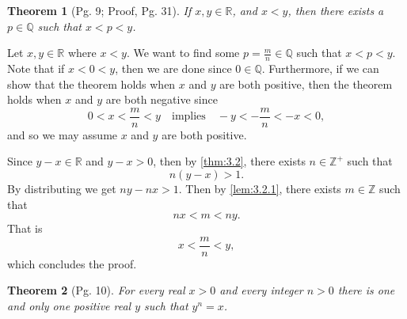 \documentclass[leqno]{article}
\makeatletter
\newtheorem{theorem}{Theorem}[section]
\theoremstyle{definition}
\theoremstyle{remark}
\let\oldproofname=\proofname
\renewcommand{\proofname}{\bf{\textit{\oldproofname}}}
\renewenvironment{proof}[1][\proofname]{\par
  \pushQED{\qed}%
  \normalfont \topsep6\p@\@plus6\p@\relax
  \list{}{\leftmargin=0mm
          \rightmargin=0mm
          \settowidth{\itemindent}{\itshape#1}%
          \labelwidth=4mm
          \parsep=0pt \listparindent=0mm%
  }
  \item[\hskip\labelsep
        \itshape
    #1\@addpunct{.}]\ignorespaces
}{%
  \popQED\endlist\@endpefalse
}
\makeatother
\begin{document}
        \begin{theorem}[Pg. 9; Proof, Pg. 31]\label{thm:3.3} 
            If $x,y\in\mathbb{R}$, and $x<y$, then there exists a $p\in\mathbb{Q}$ such that $x<p<y$. 
        \end{theorem}
            \begin{proof}
                Let $x,y\in\mathbb{R}$ where $x<y$. We want to find some $p=\frac{m}{n}\in\mathbb{Q}$ such that $x<p<y$. Note that if $x<0<y$, then we are done since $0\in\mathbb{Q}$. Furthermore, if we can show that the theorem holds when $x$ and $y$ are both positive, then the theorem holds when $x$ and $y$ are both negative since
                    \begin{equation*}
                        0< x<\frac{m}{n}<y\quad\text{implies}\quad -y<-\frac{m}{n}<-x<0,
                    \end{equation*}
                and so we may assume $x$ and $y$ are both positive.\par\hspace{4mm} Since $ y-x\in\mathbb{R}$ and $y-x>0$, then by \cref{thm:3.2}, there exists $n\in\mathbb{Z}^{+}$ such that
                    \begin{equation*}
                        n(y-x)>1.
                    \end{equation*}
                By distributing we get $ny-nx>1$. Then by \cref{lem:3.2.1}, there exists $m\in\mathbb{Z}$ such that 
                    \begin{equation*}
                        nx<m<ny.
                    \end{equation*}
                That is
                    \begin{equation*}
                        x<\frac{m}{n}<y,
                    \end{equation*}
                which concludes the proof. \cite{cum}
            \end{proof}
        \begin{theorem}[Pg. 10]\label{thm:3.4}
            For every real $x>0$ and every integer $n>0$ there is one and only one positive real $y$ such that $y^n=x$. 
        \end{theorem}
\end{document}

